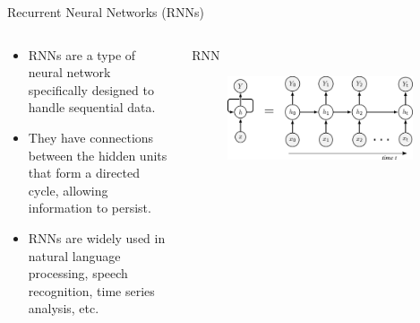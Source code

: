\documentclass[10pt,aspectratio=169,dvipsnames]{beamer} %
\begin{document}
	\begin{frame}{Recurrent Neural Networks (RNNs)}
		\begin{columns}[T]
			\begin{column}[c]{0.4\textwidth}
				\begin{itemize}
					\item RNNs are a type of neural network specifically designed to handle sequential data.
					\item They have connections between the hidden units that form a directed cycle, allowing information to persist.
					\item RNNs are widely used in natural language processing, speech recognition, time series analysis, etc.
				\end{itemize}
			\end{column}
			\begin{column}[c]{0.55\textwidth}
				\begin{block}{RNN}
					\begin{figure}
						\includegraphics[width=0.95\textwidth]{unrolled_rnn.png}
					\end{figure}
				\end{block}				
			\end{column}
		\end{columns}
	\end{frame}
	\note{}
	\setcounter{subfigure}{0}
\end{document}
